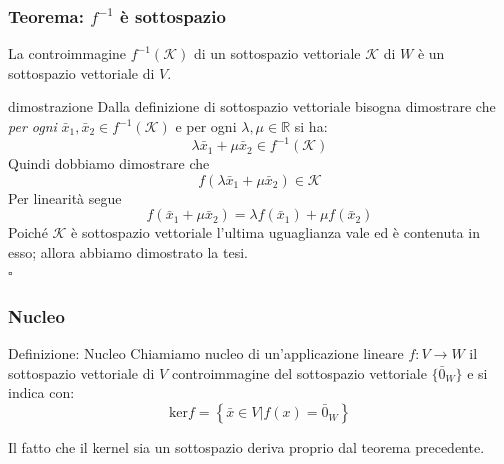 \documentclass[x11names]{article}
\newcommand*{\QEDB}{\null\nobreak\hfill\ensuremath{\square}}%
\begin{document}
\begin{center}
	\colorbox{myred}{\begin{minipage}{5.75in}
			\begin{redes}{}
				
			\subsubsection{Teorema: $f^{-1}$ è sottospazio}
			La controimmagine $f^{-1}(\mathcal{K})$ di un sottospazio vettoriale $\mathcal{K}$ di $W$ è un sottospazio vettoriale di $V$.	
			\end{redes}
	\end{minipage}}        
\end{center}
				

\begin{es}{dimostrazione}
	Dalla definizione di sottospazio vettoriale bisogna dimostrare che \textit{per ogni} $\bar{x}_{1},\bar{x}_{2} \in f^{-1}(\mathcal{K})$ e per ogni $\lambda, \mu \in \mathbb{R}$ si ha:
	\[
	\lambda \bar{x}_{1} + \mu \bar{x}_{2} \in f^{-1}(\mathcal{K})
	\]
	Quindi dobbiamo dimostrare che 
	\[
	f\left(\lambda\bar{x}_{1} + \mu \bar{x}_{2}\right) \in \mathcal{K}
	\]
	Per linearità segue
	\[
	f\left(\bar{x}_{1} + \mu \bar{x}_{2}\right) = \lambda f\left(\bar{x}_{1}\right) + \mu f\left(\bar{x}_{2}\right)
	\]
	Poiché $\mathcal{K}$ è sottospazio vettoriale l'ultima uguaglianza vale ed è contenuta in esso; allora abbiamo dimostrato la tesi.
	\\
	\QEDB
\end{es}

\subsubsection{Nucleo}
	\begin{center}
	\colorbox{myblue}{\begin{minipage}{5.75in}
			\begin{blues}{Definizione: Nucleo}
				Chiamiamo nucleo di un'applicazione lineare $f:V\to W$ il sottospazio vettoriale di $V$ controimmagine del sottospazio vettoriale $\{\bar{0}_{W}\}$ e si indica con:
				\[
				\text{ker}f = \left\{\bar{x} \in V | f(x) = \bar{0}_{W}\right\}
				\]
			\end{blues}
	\end{minipage}}       
\end{center}
Il fatto che il kernel sia un sottospazio deriva proprio dal teorema precedente.
\end{document}
